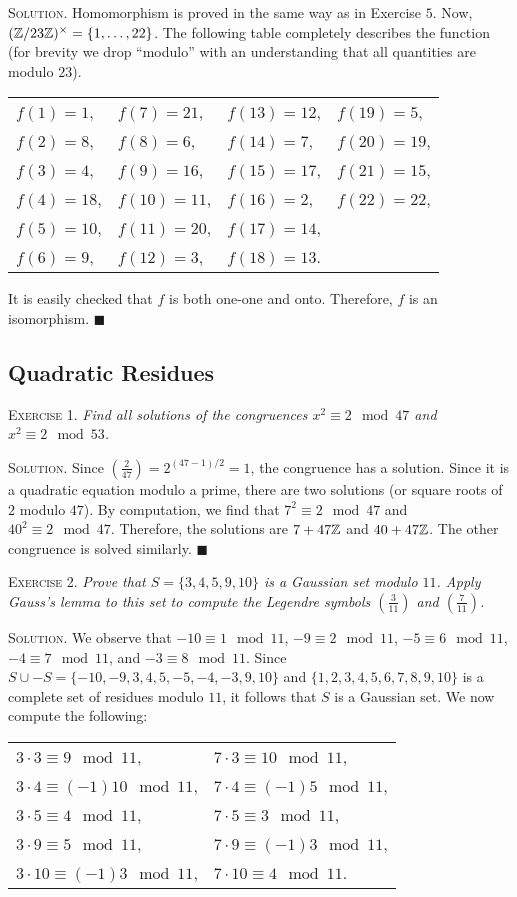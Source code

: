 \documentclass[11pt, leqno]{article}
\newcommand{\done}{\ensuremath{\blacksquare}}
\begin{document}
\textsc{Solution}. Homomorphism is proved in the same way as in Exercise $5$. Now, $(\mathbb{Z}/23\mathbb{Z})^{\times} = \{1, \ldots, 22\}$. The following table completely describes the function (for brevity we drop ``modulo'' with an understanding that all quantities are modulo $23$).
\begin{longtable}{p{6em} p{6em} p{6em} p{6em}}
  $f(1) = 1$, & $f(7) = 21$, & $f(13) = 12$, & $f(19) = 5$,\\
  $f(2) = 8$, & $f(8) = 6$, & $f(14) = 7$, & $f(20) = 19$,\\
  $f(3) = 4$, & $f(9) = 16$, & $f(15) = 17$, & $f(21) = 15$,\\
  $f(4) = 18$, & $f(10) = 11$, & $f(16) = 2$, & $f(22) = 22$,\\
  $f(5) = 10$, & $f(11) = 20$, & $f(17) = 14$, & \\
  $f(6) = 9$, & $f(12) = 3$, & $f(18) = 13$. & 
\end{longtable}
\reduce
It is easily checked that $f$ is both one-one and onto. Therefore, $f$ is an isomorphism. \done

\subsection{Quadratic Residues}

\textsc{Exercise 1}. \emph{Find all solutions of the congruences $x^2 \equiv 2 \mod 47$ and $x^2 \equiv 2 \mod 53$.}

\textsc{Solution}. Since $\left( \frac{2}{47} \right) = 2^{(47-1)/2} = 1$, the congruence has a solution. Since it is a quadratic equation modulo a prime, there are two solutions (or square roots of $2$ modulo $47$). By computation, we find that $7^2 \equiv 2 \mod 47$ and $40^2 \equiv 2 \mod 47$. Therefore, the solutions are $7+47\mathbb{Z}$ and $40+47\mathbb{Z}$. The other congruence is solved similarly. \done

\textsc{Exercise 2}. \emph{Prove that $S=\{3, 4, 5, 9, 10\}$ is a Gaussian set modulo $11$. Apply Gauss's lemma to this set to compute the Legendre symbols $\left(\frac{3}{11}\right)$ and $\left(\frac{7}{11}\right)$.}

\textsc{Solution}. We observe that $-10 \equiv 1 \mod 11$, $-9 \equiv 2 \mod 11$, $-5 \equiv 6 \mod 11$, $-4 \equiv 7 \mod 11$, and $-3 \equiv 8 \mod 11$. Since $S\cup -S = \{-10, -9, 3, 4, 5, -5, -4, -3, 9, 10\}$ and $\{1, 2, 3, 4, 5, 6, 7, 8, 9, 10\}$ is a complete set of residues modulo $11$, it follows that $S$ is a Gaussian set. We now compute the following:
\begin{longtable}{p{12em} p{12em}}
  $3 \cdot 3 \equiv 9 \mod 11$, & $7 \cdot 3 \equiv 10 \mod 11$,\\
  $3 \cdot 4 \equiv (-1)10 \mod 11$, & $7 \cdot 4 \equiv (-1)5 \mod 11$,\\
  $3 \cdot 5 \equiv 4 \mod 11$, & $7 \cdot 5 \equiv 3 \mod 11$,\\
  $3 \cdot 9 \equiv 5 \mod 11$, & $7 \cdot 9 \equiv (-1)3 \mod 11$,\\
  $3 \cdot 10 \equiv (-1)3 \mod 11$, & $7 \cdot 10 \equiv 4 \mod 11$.\\
\end{longtable}
\reduce
\end{document}
